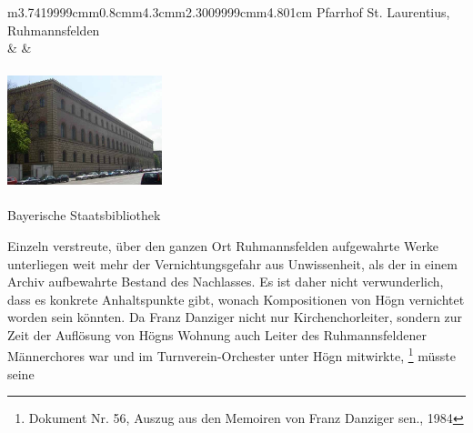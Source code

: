 \begin{flushleft}
\begin{supertabular}{m{3.7419999cm}m{0.8cm}m{4.3cm}m{2.3009999cm}m{4.801cm}}
{Pfarrhof St. Laurentius,
Ruhmannsfelden}\\
 &
 &

\includegraphics[width=4.509cm,height=3.491cm]{pictures/zulassungsarbeit-img067.jpg}

Bayerische Staatsbibliothek\\
\end{supertabular}
\end{flushleft}
Einzeln verstreute, über den ganzen Ort Ruhmannsfelden aufgewahrte Werke
unterliegen weit mehr der Vernichtungsgefahr aus Unwissenheit, als der
in einem Archiv aufbewahrte Bestand des Nachlasses. Es ist daher nicht
verwunderlich, dass es konkrete Anhaltspunkte gibt, wonach
Kompositionen von Högn vernichtet worden sein könnten. Da Franz
Danziger nicht nur Kirchenchorleiter, sondern zur Zeit der Auflösung
von Högns Wohnung auch Leiter des Ruhmannsfeldener Männerchores war und
im Turnverein-Orchester unter Högn mitwirkte, \footnote{Dokument Nr.
56, Auszug aus den Memoiren von Franz Danziger sen., 1984} müsste seine
